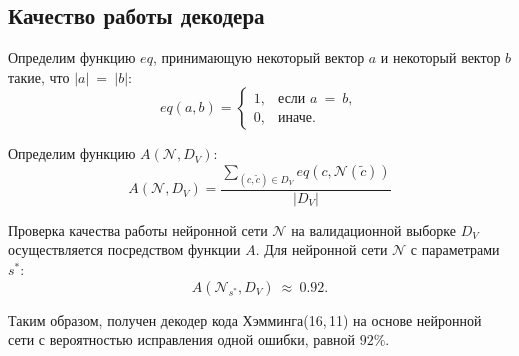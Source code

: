 \subsection{Качество работы декодера}\label{subsec:accuracy}

Определим функцию $eq$, принимающую некоторый вектор $a$ и некоторый вектор $b$ такие, что $|a|~=~|b|$:
\begin{equation}\label{eq:equal}
    eq(a, b) =
    \begin{cases}
        1, & \mbox{если } a~=~b, \\
        0, & \mbox{иначе}.
    \end{cases}
\end{equation}

Определим функцию $A(\mathcal{N}, D_V)$:
\begin{equation}\label{eq:accuracy}
    A(\mathcal{N}, D_V) = \frac{\sum\limits_{(c, \widetilde{c})\in D_V}eq(c, \mathcal{N}(\widetilde{c}))}{|D_V|}
\end{equation}
\newpage

Проверка качества работы нейронной сети $\mathcal{N}$ на валидационной выборке $D_V$ осуществляется посредством функции $A$. Для нейронной сети $\mathcal{N}$ с параметрами $s^*$:
\begin{equation}\label{eq:final_accuracy}
  A(\mathcal{N}_{s^*}, D_V)~\approx~0.92.
\end{equation}

Таким образом, получен декодер кода Хэмминга(16,\,11) на основе нейронной сети с вероятностью исправления одной ошибки, равной $92 \%$.
